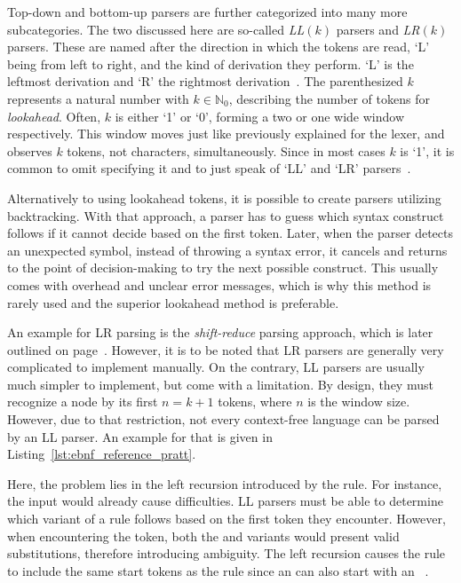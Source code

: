 Top-down and bottom-up parsers are further categorized into many more subcategories.
The two discussed here are so-called \emph{LL$(k)$} parsers and \emph{LR$(k)$} parsers.
These are named after the direction in which the tokens are read, `L' being from left to right, and the kind of derivation they perform.
`L' is the leftmost derivation and `R' the rightmost derivation~\cite[pp.~75f]{Watson2017}.
The parenthesized $k$ represents a natural number with $k\in\mathbb{N}_0$, describing the number of tokens for \emph{lookahead}.
Often, $k$ is either `1' or `0', forming a two or one wide window respectively.
This window moves just like previously explained for the lexer, and observes $k$ tokens, not characters, simultaneously.
Since in most cases $k$ is `1', it is common to omit specifying it and to just speak of `LL' and `LR' parsers~\cite[pp.~86--88]{Watson2017}.

Alternatively to using lookahead tokens, it is possible to create parsers utilizing backtracking.
With that approach, a parser has to guess which syntax construct follows if it cannot decide based on the first token.
Later, when the parser detects an unexpected symbol, instead of throwing a syntax error, it cancels and returns to the point of decision-making to try the next possible construct.
This usually comes with overhead and unclear error messages, which is why this method is rarely used and the superior lookahead method is preferable.

An example for LR parsing is the \emph{shift-reduce} parsing approach, which is later outlined on page~\pageref{sec:parser_generators}.
However, it is to be noted that LR parsers are generally very complicated to implement manually.
On the contrary, LL parsers are usually much simpler to implement, but come with a limitation.
By design, they must recognize a node by its first $n=k+1$ tokens, where $n$ is the window size.
However, due to that restriction, not every context-free language can be parsed by an LL parser.
An example for that is given in Listing~\ref{lst:ebnf_reference_pratt}.


Here, the problem lies in the left recursion introduced by the  rule.
For instance, the input  would already cause difficulties.
LL parsers must be able to determine which variant of a rule follows based on the first token they encounter.
However, when encountering the  token, both the  and  variants would present valid substitutions, therefore introducing ambiguity.
The left recursion causes the  rule to include the same start tokens as the  rule since an  can also start with an ~\cite[p.~85]{Watson2017}.

